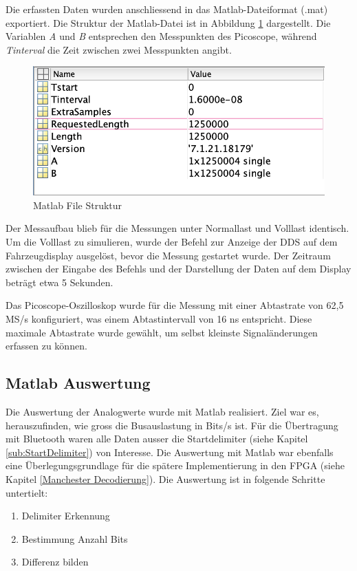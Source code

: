 Die erfassten Daten wurden anschliessend in das Matlab-Dateiformat (.mat) exportiert. Die Struktur der Matlab-Datei ist in Abbildung \ref{fig:MatlabFileStruktur} dargestellt. Die Variablen \textit{A} und \textit{B} entsprechen den Messpunkten des Picoscope, während \textit{Tinterval} die Zeit zwischen zwei Messpunkten angibt. 

\begin{figure}[H]
    \centering
    \includegraphics[width=0.5\linewidth]{Figures/Chap3/Busauslastung/Matlab_file_struktur.png}
    \caption{Matlab File Struktur}
    \label{fig:MatlabFileStruktur}
\end{figure}

Der Messaufbau blieb für die Messungen unter Normallast und Volllast identisch. Um die Volllast zu simulieren, wurde der Befehl zur Anzeige der DDS auf dem Fahrzeugdisplay ausgelöst, bevor die Messung gestartet wurde. Der Zeitraum zwischen der Eingabe des Befehls und der Darstellung der Daten auf dem Display beträgt etwa 5 Sekunden.

Das Picoscope-Oszilloskop wurde für die Messung mit einer Abtastrate von 62,5 MS/s konfiguriert, was einem Abtastintervall von 16 ns entspricht. Diese maximale Abtastrate wurde gewählt, um selbst kleinste Signaländerungen erfassen zu können. 

\subsection{Matlab Auswertung}
Die Auswertung der Analogwerte wurde mit Matlab realisiert. Ziel war es, herauszufinden, wie gross die Busauslastung in Bits/s ist. Für die Übertragung mit Bluetooth waren alle Daten ausser die Startdelimiter (siehe Kapitel \ref{sub:StartDelimiter}) von Interesse. Die Auswertung mit Matlab war ebenfalls eine Überlegungsgrundlage für die spätere Implementierung in den FPGA (siehe Kapitel \ref{Manchester Decodierung}). Die Auswertung ist in folgende Schritte untertielt:
\begin{enumerate}
    \item Delimiter Erkennung
    \item Bestimmung Anzahl Bits
    \item Differenz bilden
\end{enumerate}


